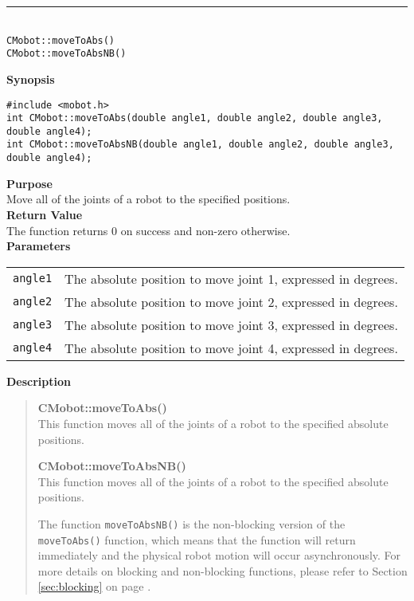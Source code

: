 \noindent
\vspace{5pt}
\rule{4.5in}{0.015in}\\
\noindent
{\LARGE \texttt{CMobot::moveToAbs()}}\\
{\LARGE \texttt{CMobot::moveToAbsNB()}}\\
{}

\noindent
{\bf Synopsis}
\vspace{-8pt}
\begin{verbatim}
#include <mobot.h>
int CMobot::moveToAbs(double angle1, double angle2, double angle3, double angle4);
int CMobot::moveToAbsNB(double angle1, double angle2, double angle3, double angle4);
\end{verbatim}

\noindent
{\bf Purpose}\\
Move all of the joints of a robot to the specified positions.\\

\noindent
{\bf Return Value}\\
The function returns 0 on success and non-zero otherwise.\\

\noindent
{\bf Parameters}\\
\vspace{-0.1in}
\begin{description}
\item               
\begin{tabular}{p{15 mm}p{105 mm}}
\texttt{angle1} & The absolute position to move joint 1, expressed in degrees. \\
\texttt{angle2} & The absolute position to move joint 2, expressed in degrees. \\
\texttt{angle3} & The absolute position to move joint 3, expressed in degrees. \\
\texttt{angle4} & The absolute position to move joint 4, expressed in degrees. \\
\end{tabular}
\end{description}
\noindent

{\bf Description}\\
\vspace{-12pt}
\begin{quote}
{\bf CMobot::moveToAbs()}\\
This function moves all of the joints of a robot to the specified absolute positions. 

{\bf CMobot::moveToAbsNB()}\\
This function moves all of the joints of a robot to the specified absolute positions. 

The function \texttt{moveToAbsNB()} is the non-blocking version of
the \texttt{moveToAbs()} function, which means that the function will return
immediately and the physical robot motion will occur asynchronously. For
more details on blocking and non-blocking functions, please refer to 
Section \ref{sec:blocking} on page \pageref{sec:blocking}.\\
\end{quote}

